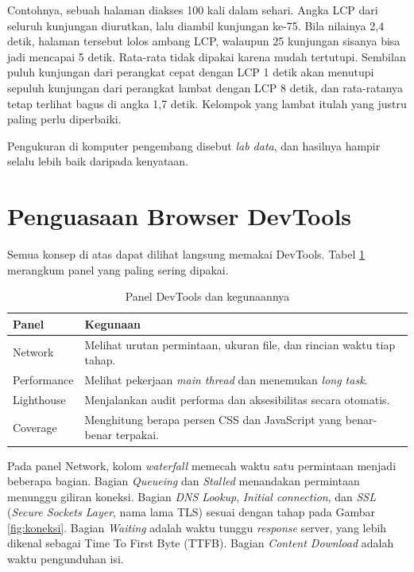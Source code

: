 Contohnya, sebuah halaman diakses 100 kali dalam sehari. Angka LCP dari seluruh
kunjungan diurutkan, lalu diambil kunjungan ke-75. Bila nilainya 2,4 detik,
halaman tersebut lolos ambang LCP, walaupun 25 kunjungan sisanya bisa jadi
mencapai 5 detik. Rata-rata tidak dipakai karena mudah tertutupi. Sembilan
puluh kunjungan dari perangkat cepat dengan LCP 1 detik akan menutupi sepuluh
kunjungan dari perangkat lambat dengan LCP 8 detik, dan rata-ratanya tetap
terlihat bagus di angka 1,7 detik. Kelompok yang lambat itulah yang justru
paling perlu diperbaiki.

Pengukuran di komputer pengembang disebut \textit{lab data}, dan hasilnya
hampir selalu lebih baik daripada kenyataan.

\section{Penguasaan Browser DevTools}

Semua konsep di atas dapat dilihat langsung memakai DevTools. Tabel
\ref{tab:devtools} merangkum panel yang paling sering dipakai.

\begin{table}[!htb]
  \centering
  \caption{Panel DevTools dan kegunaannya}
  \label{tab:devtools}
  \begin{tabularx}{\textwidth}{lX}
    \hline
    \textbf{Panel} & \textbf{Kegunaan} \\
    \hline
    Network & Melihat urutan permintaan, ukuran file, dan rincian waktu tiap tahap. \\
    \hline
    Performance & Melihat pekerjaan \textit{main thread} dan menemukan \textit{long task}. \\
    \hline
    Lighthouse \cite{lighthouse} & Menjalankan audit performa dan aksesibilitas secara otomatis. \\
    \hline
    Coverage & Menghitung berapa persen CSS dan JavaScript yang benar-benar terpakai. \\
    \hline
  \end{tabularx}
\end{table}

Pada panel Network, kolom \textit{waterfall} memecah waktu satu permintaan
menjadi beberapa bagian. Bagian \emph{Queueing} dan \emph{Stalled} menandakan
permintaan menunggu giliran koneksi. Bagian \emph{DNS Lookup},
\emph{Initial connection}, dan \emph{SSL} (\textit{Secure Sockets Layer}, nama lama TLS) sesuai dengan
tahap pada Gambar
\ref{fig:koneksi}. Bagian \emph{Waiting} adalah waktu tunggu \textit{response} server,
yang lebih dikenal sebagai Time To First Byte (TTFB). Bagian \emph{Content Download} adalah waktu
pengunduhan isi.

